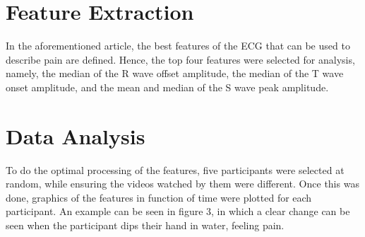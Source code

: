 \section{Feature Extraction}
In the aforementioned article, the best features of the ECG that can be used to describe pain are defined.
Hence, the top four features were selected for analysis, namely, the median of the R wave offset amplitude, the median of the T wave onset amplitude, and the mean and median of the S wave peak amplitude.

\section{Data Analysis}
To do the optimal processing of the features, five participants were selected at random, while ensuring the videos watched by them were different. 
Once this was done, graphics of the features in function of time were plotted for each participant. 
An example can be seen in figure 3, in which a clear change can be seen when the participant dips their hand in water, feeling pain. 









